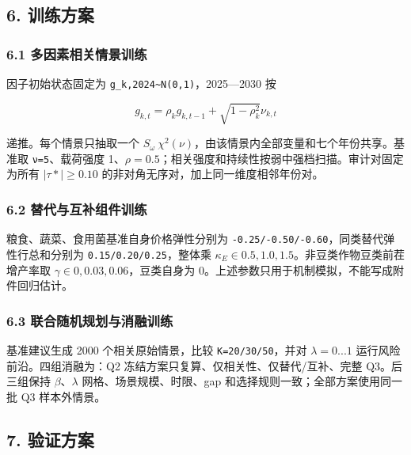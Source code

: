 \documentclass[UTF8,11pt,a4paper]{ctexart}
\begin{document}
\subsection{6. 训练方案}

\subsubsection{6.1 多因素相关情景训练}

因子初始状态固定为 \texttt{g\_k,2024\textasciitilde{}N(0,1)}，2025—2030 按

\[
g_{k,t}=\rho_kg_{k,t-1}+\sqrt{1-\rho_k^2}\nu_{k,t}
\]

递推。每个情景只抽取一个 \(S_\omega{}~\chi{}^{2}(ν)\)，由该情景内全部变量和七个年份共享。基准取 \texttt{ν=5}、载荷强度 1、\(\rho{}=0.5\)；相关强度和持续性按弱中强档扫描。审计对固定为所有 \(|\tau{}*|\geq{}0.10\) 的非对角无序对，加上同一维度相邻年份对。

\subsubsection{6.2 替代与互补组件训练}

粮食、蔬菜、食用菌基准自身价格弹性分别为 \texttt{-0.25/-0.50/-0.60}，同类替代弹性行总和分别为 \texttt{0.15/0.20/0.25}，整体乘 \(\kappa{}_{E}\in{}{0.5,1.0,1.5}\)。非豆类作物豆类前茬增产率取 \(\gamma{}\in{}{0,0.03,0.06}\)，豆类自身为 0。上述参数只用于机制模拟，不能写成附件回归估计。

\subsubsection{6.3 联合随机规划与消融训练}

基准建议生成 2000 个相关原始情景，比较 \texttt{K=20/30/50}，并对 \(\lambda{}=0...1\) 运行风险前沿。四组消融为：Q2 冻结方案只复算、仅相关性、仅替代/互补、完整 Q3。后三组保持 \(\beta{}\)、\(\lambda{}\) 网格、场景规模、时限、gap 和选择规则一致；全部方案使用同一批 Q3 样本外情景。

\subsection{7. 验证方案}
\end{document}

